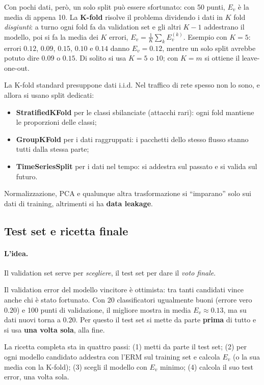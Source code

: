 Con pochi dati, però, un solo split può essere sfortunato: con 50 punti, $E_v$ è la media di appena 10. La \textbf{K-fold} risolve il problema dividendo i dati in $K$ fold \emph{disgiunti}: a turno ogni fold fa da validation set e gli altri $K-1$ addestrano il modello, poi si fa la media dei $K$ errori, $E_v = \frac{1}{K}\sum_k E_v^{(k)}$. Esempio con $K = 5$: errori $0.12$, $0.09$, $0.15$, $0.10$ e $0.14$ danno $E_v = 0.12$, mentre un solo split avrebbe potuto dire $0.09$ o $0.15$. Di solito si usa $K = 5$ o $10$; con $K = m$ si ottiene il leave-one-out.

La K-fold standard presuppone dati i.i.d. Nel traffico di rete spesso non lo sono, e allora si usano split dedicati:
\begin{itemize}
    \item \textbf{StratifiedKFold} per le classi sbilanciate (attacchi rari): ogni fold mantiene le proporzioni delle classi;
    \item \textbf{GroupKFold} per i dati raggruppati: i pacchetti dello stesso flusso stanno tutti dalla stessa parte;
    \item \textbf{TimeSeriesSplit} per i dati nel tempo: si addestra sul passato e si valida sul futuro.
\end{itemize}
Normalizzazione, PCA e qualunque altra trasformazione si ``imparano'' solo sui dati di training, altrimenti si ha \textbf{data leakage}.

\subsection{Test set e ricetta finale}
\paragraph*{L'idea.} Il validation set serve per \emph{scegliere}, il test set per dare il \emph{voto finale}.

Il validation error del modello vincitore è ottimista: tra tanti candidati vince anche chi è stato fortunato. Con 20 classificatori ugualmente buoni (errore vero $0.20$) e 100 punti di validazione, il migliore mostra in media $E_v \approx 0.13$, ma su dati nuovi torna a $0.20$. Per questo il test set si mette da parte \textbf{prima} di tutto e si usa \textbf{una volta sola}, alla fine.

La ricetta completa sta in quattro passi: (1) metti da parte il test set; (2) per ogni modello candidato addestra con l'ERM sul training set e calcola $E_v$ (o la sua media con la K-fold); (3) scegli il modello con $E_v$ minimo; (4) calcola il suo test error, una volta sola.

